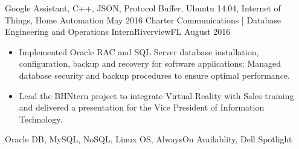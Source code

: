 \begin{experiences}
{\begin{itemize}
                      \end{itemize}
                    }
                    {Google Assistant, C++, JSON, Protocol Buffer, Ubuntu 14.04, Internet of Things, Home Automation}
  \emptySeparator
  \experience
    {May 2016}     {Charter Communications | Database Engineering and Operations Intern}{Riverview}{FL}
    {August 2016}    {
                      \begin{itemize}
                       \item Implemented Oracle RAC and SQL Server database installation, configuration, backup and recovery for software applications; Managed database security and backup procedures to ensure optimal performance.
                        \item Lead the BHNtern project to integrate Virtual Reality with Sales training and delivered a presentation for the Vice President of Information Technology.             
                      \end{itemize}
                    }
                    {Oracle DB, MySQL, NoSQL, Linux OS, AlwaysOn Availablity, Dell Spotlight}
\end{experiences}
